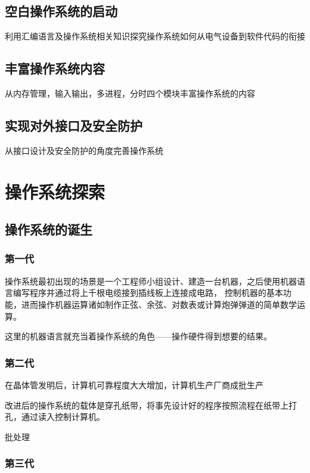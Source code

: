 \documentclass{swfcthesis}
\begin{document}
	\section{空白操作系统的启动}
	利用汇编语言及操作系统相关知识探究操作系统如何从电气设备到软件代码的衔接
	
	\section{丰富操作系统内容}
	从内存管理，输入输出，多进程，分时四个模块丰富操作系统的内容
	
	\section{实现对外接口及安全防护}
	从接口设计及安全防护的角度完善操作系统
	
\chapter{操作系统探索}

	\section{操作系统的诞生}

		\subsection{第一代}

		操作系统最初出现的场景是一个工程师小组设计、建造一台机器，之后使用机器语言编写程序并通过将上千根电缆接到插线板上连接成电路，
		控制机器的基本功能，进而操作机器运算诸如制作正弦、余弦、对数表或计算炮弹弹道的简单数学运算。

		这里的机器语言就充当着操作系统的角色——操作硬件得到想要的结果。

		\subsection{第二代}

		在晶体管发明后，计算机可靠程度大大增加，计算机生产厂商成批生产

		改进后的操作系统的载体是穿孔纸带，将事先设计好的程序按照流程在纸带上打孔，通过读入控制计算机。

		批处理

		\subsection{第三代}
\end{document}
